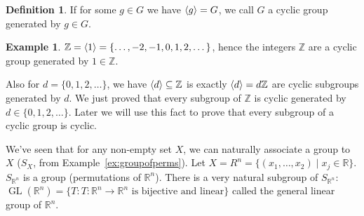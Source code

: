 \documentclass[12pt,letterpaper,DIV=11,final]{scrartcl}
\theoremstyle{plain}
\theoremstyle{definition}
\newtheorem{definition}{Definition}[section]
\newtheorem{example}{Example}[section]
\theoremstyle{remark}
\DeclareMathOperator{\gl}{GL} %
\begin{document}
\begin{definition}\label{def:cyclicgroup}
  If for some $g \in G$ we have $\braket{g} = G$, we call $G$ a cyclic group generated by $g \in G$.
\end{definition}

\begin{example}\label{ex:cyclicgroup_int}
  $\mathbb{Z} = \braket{1} = \{ \dots, -2, -1, 0, 1, 2, \dots \}$, hence the integers $\mathbb{Z}$ are a cyclic group generated by $1 \in \mathbb{Z}$.
\end{example}

Also for $d = \{ 0, 1, 2, \dots \}$, we have $\braket{d} \subseteq \mathbb{Z}$ is exactly $\braket{d} = d \mathbb{Z}$ are cyclic subgroups generated by $d$.
We just proved that every subgroup of $\mathbb{Z}$ is cyclic generated by $d \in \{ 0, 1, 2, \dots \}$.
Later we will use this fact to prove that every subgroup of a cyclic group is cyclic.

We've seen that for any non-empty set $X$, we can naturally associate a group to $X$ ($S_X$, from Example~\ref{ex:groupofperms}).
Let $X = R^n = \{ (x_1, \dots, x_2) \mid x_j \in \mathbb{R} \}$.
$S_{\mathbb{R}^n}$ is a group (permutations of $\mathbb{R}^n$).
There is a very natural subgroup of $S_{\mathbb{R}^n}$: $\gl(\mathbb{R}^n) = \{ T : T : \mathbb{R}^n \to \mathbb{R}^n \text{ is bijective and linear} \}$ called the general linear group of $\mathbb{R}^n$.
\end{document}
